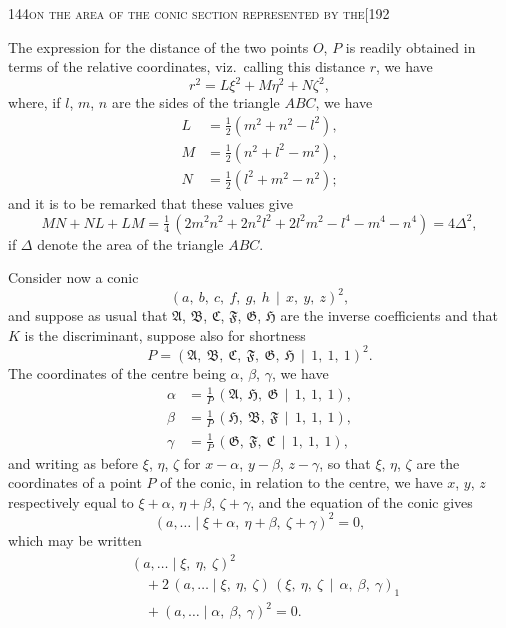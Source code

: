 \documentclass[11pt]{article}
\begin{document}
\begin{center}
\small 144\hfill\textsc{on the area of the conic section represented by the}\hfill[192
\end{center}

\medskip

\noindent The expression for the distance of the two points $O$, $P$ is readily obtained in terms of the relative coordinates, viz.\ calling this distance $r$, we have
\[
r^{2} = L\xi^{2} + M\eta^{2} + N\zeta^{2},
\]
where, if $l$, $m$, $n$ are the sides of the triangle $ABC$, we have
\begin{align*}
L &= \tfrac{1}{2}(m^{2} + n^{2} - l^{2}), \\
M &= \tfrac{1}{2}(n^{2} + l^{2} - m^{2}), \\
N &= \tfrac{1}{2}(l^{2} + m^{2} - n^{2});
\end{align*}
and it is to be remarked that these values give
\[
MN + NL + LM = \tfrac{1}{4}\,(2 m^{2} n^{2} + 2 n^{2} l^{2} + 2 l^{2} m^{2} - l^{4} - m^{4} - n^{4}) = 4\Delta^{2},
\]
if $\Delta$ denote the area of the triangle $ABC$.

Consider now a conic
\[
(a,\ b,\ c,\ f,\ g,\ h\,\mid\, x,\ y,\ z)^{2},
\]
and suppose as usual that $\mathfrak{A}$, $\mathfrak{B}$, $\mathfrak{C}$, $\mathfrak{F}$, $\mathfrak{G}$, $\mathfrak{H}$ are the inverse coefficients and that $K$ is the discriminant, suppose also for shortness
\[
P = (\mathfrak{A},\ \mathfrak{B},\ \mathfrak{C},\ \mathfrak{F},\ \mathfrak{G},\ \mathfrak{H}\,\mid\, 1,\ 1,\ 1)^{2}.
\]
The coordinates of the centre being $\alpha$, $\beta$, $\gamma$, we have
\begin{align*}
\alpha &= \frac{1}{P}\,(\mathfrak{A},\ \mathfrak{H},\ \mathfrak{G}\,\mid\, 1,\ 1,\ 1), \\
\beta &= \frac{1}{P}\,(\mathfrak{H},\ \mathfrak{B},\ \mathfrak{F}\,\mid\, 1,\ 1,\ 1), \\
\gamma &= \frac{1}{P}\,(\mathfrak{G},\ \mathfrak{F},\ \mathfrak{C}\,\mid\, 1,\ 1,\ 1),
\end{align*}
and writing as before $\xi$, $\eta$, $\zeta$ for $x - \alpha$, $y - \beta$, $z - \gamma$, so that $\xi$, $\eta$, $\zeta$ are the coordinates of a point $P$ of the conic, in relation to the centre, we have $x$, $y$, $z$ respectively equal to $\xi + \alpha$, $\eta + \beta$, $\zeta + \gamma$, and the equation of the conic gives
\[
(a,\ldots \mid \xi + \alpha,\ \eta + \beta,\ \zeta + \gamma)^{2} = 0,
\]
which may be written
\begin{align*}
&(a,\ldots \mid \xi,\ \eta,\ \zeta)^{2} \\
&\quad + 2\,(a,\ldots \mid \xi,\ \eta,\ \zeta)\,(\xi,\ \eta,\ \zeta\,\mid\,\alpha,\ \beta,\ \gamma)_{1} \\
&\quad + (a,\ldots \mid \alpha,\ \beta,\ \gamma)^{2} = 0.
\end{align*}
\end{document}
